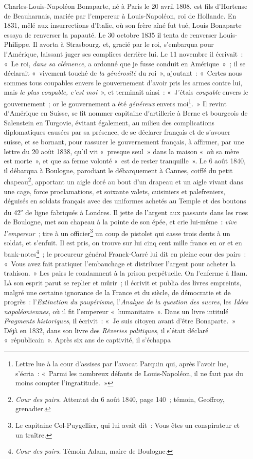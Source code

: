 \documentclass[french,twoside]{book} %
\begin{document}
\noindent Charles-Louis-Napoléon Bonaparte, né à Paris le 20 avril 1808, est fils d’Hortense de Beauharnais, mariée par l’empereur à Louis-Napoléon, roi de Hollande. En 1831, mêlé aux insurrections d’Italie, où son frère aîné fut tué, Louis Bonaparte essaya de renverser la papauté. Le 30 octobre 1835 il tenta de renverser Louis-Philippe. Il avorta à Strasbourg, et, gracié par le roi, s’embarqua pour l’Amérique, laissant juger ses complices derrière lui. Le 11 novembre il écrivait : « Le roi, \emph{dans sa clémence}, a ordonné que je fusse conduit en Amérique » ; il se déclarait « vivement touché de \emph{la générosité} du roi », ajoutant : « Certes nous sommes tous coupables envers le gouvernement d’avoir pris les armes contre lui, mais \emph{le plus coupable, c’est moi} », et terminait ainsi : « J’étais \emph{coupable} envers le gouvernement ; or le gouvernement a été \emph{généreux} envers moi\footnote{Lettre lue à la cour d’assises par l’avocat Parquin qui, après l’avoir lue, s’écria : « Parmi les nombreux défauts de Louis-Napoléon, il ne faut pas du moins compter l’ingratitude. »}. » Il revint d’Amérique en Suisse, se fit nommer capitaine d’artillerie à Berne et bourgeois de Salenstein en Turgovie, évitant également, au milieu des complications diplomatiques causées par sa présence, de se déclarer français et de s’avouer suisse, et se bornant, pour rassurer le gouvernement français, à affirmer, par une lettre du 20 août 1838, qu’il vit « presque seul » dans la maison « où sa mère est morte », et que sa ferme volonté « est de rester tranquille ». Le 6 août 1840, il débarqua à Boulogne, parodiant le débarquement à Cannes, coiffé du petit chapeau\footnote{\emph{Cour des pairs}. Attentat du 6 août 1840, page 140 ; témoin, Geoffroy, grenadier.}, apportant un aigle doré au bout d’un drapeau et un aigle vivant dans une cage, force proclamations, et soixante valets, cuisiniers et palefreniers, déguisés en soldats français avec des uniformes achetés au Temple et des boutons du 42\textsuperscript{e} de ligne fabriqués à Londres. Il jette de l’argent aux passants dans les rues de Boulogne, met son chapeau à la pointe de son épée, et crie lui-même : \emph{vive l’empereur} ; tire à un officier\footnote{Le capitaine Col-Puygellier, qui lui avait dit : Vous êtes un conspirateur et un traître.} un coup de pistolet qui casse trois dents à un soldat, et s’enfuit. Il est pris, on trouve sur lui cinq cent mille francs en or et en bank-notes\footnote{\emph{Cour des pairs}. Témoin Adam, maire de Boulogne.} ; le procureur général Franck-Carré lui dit en pleine cour des pairs : « Vous avez fait pratiquer l’embauchage et distribuer l’argent pour acheter la trahison. » Les pairs le condamnent à la prison perpétuelle. On l’enferme à Ham. Là son esprit parut se replier et mûrir ; il écrivit et publia des livres empreints, malgré une certaine ignorance de la France et du siècle, de démocratie et de progrès : l’\emph{Extinction du paupérisme}, l’\emph{Analyse de la question des sucres}, les \emph{Idées napoléoniennes}, où il fit l’empereur « humanitaire ». Dans un livre intitulé \emph{Fragments historiques}, il écrivit : « Je suis citoyen avant d’être Bonaparte. » Déjà en 1832, dans son livre des \emph{Rêveries politiques}, il s’était déclaré « républicain ». Après six ans de captivité, il s’échappa 
\end{document}
